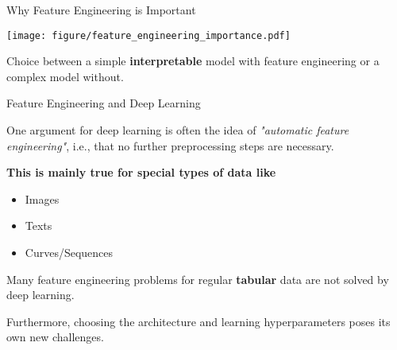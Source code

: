 
\begin{vbframe}{Why Feature Engineering is Important}

\begin{center}
\texttt{[image: figure/feature\_engineering\_importance.pdf]}
\end{center}

Choice between a simple \textbf{interpretable} model with feature engineering or a complex model without.

\end{vbframe}


\begin{vbframe}{Feature Engineering and Deep Learning}

One argument for deep learning is often the idea of \textit{"automatic feature engineering"}, i.e., that no further preprocessing steps are necessary.

\lz

\textbf{This is mainly true for special types of data like}

\begin{itemize}
\item Images
\item Texts
\item Curves/Sequences
\end{itemize}

Many feature engineering problems for regular \textbf{tabular} data are not solved by deep learning.

Furthermore, choosing the architecture and learning hyperparameters poses its own new challenges.

\end{vbframe}
